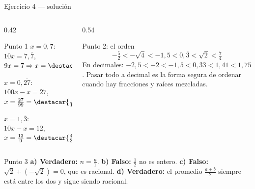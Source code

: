 \documentclass[aspectratio=169,10pt]{beamer}
\begin{document}
\begin{frame}{Ejercicio 4 — solución}
  \scriptsize
  \begin{columns}[T,onlytextwidth]
    \begin{column}{0.42\textwidth}
      \begin{block}{Punto 1}
        \tiny
        $x = 0{,}\overline{7}$: \ $10x = 7{,}\overline{7}$, \
        $9x = 7 \Rightarrow x = \destacar{\tfrac{7}{9}}$

        \vspace{0.08cm}
        $x = 0{,}\overline{27}$: \ $100x - x = 27$, \
        $x = \tfrac{27}{99} = \destacar{\tfrac{3}{11}}$

        \vspace{0.08cm}
        $x = 1{,}\overline{3}$: \ $10x - x = 12$, \
        $x = \tfrac{12}{9} = \destacar{\tfrac{4}{3}}$
      \end{block}
    \end{column}
    \begin{column}{0.54\textwidth}
      \begin{exampleblock}{Punto 2: el orden}
        \tiny
        \[ -\tfrac{5}{2} < -\sqrt{4} < -1{,}5 < 0{,}\overline{3}
           < \sqrt{2} < \tfrac{7}{4} \]
        En decimales: $-2{,}5 < -2 < -1{,}5 < 0{,}33 < 1{,}41 < 1{,}75$.
        \vspace{0.05cm}
        {\color{uniGris} Pasar todo a decimal es la forma segura de ordenar
        cuando hay fracciones y raíces mezcladas.}
      \end{exampleblock}
    \end{column}
  \end{columns}

  \vspace{0.05cm}
  \begin{alertblock}{Punto 3}
    \tiny
    \textbf{a) Verdadero:} $n = \frac{n}{1}$. \quad
    \textbf{b) Falso:} $\frac{1}{2}$ no es entero. \quad
    \textbf{c) Falso:} $\sqrt{2} + (-\sqrt{2}) = 0$, que es racional. \quad
    \textbf{d) Verdadero:} el promedio $\frac{a+b}{2}$ siempre está entre los
    dos y sigue siendo racional. 
  \end{alertblock}
\end{frame}
\end{document}
